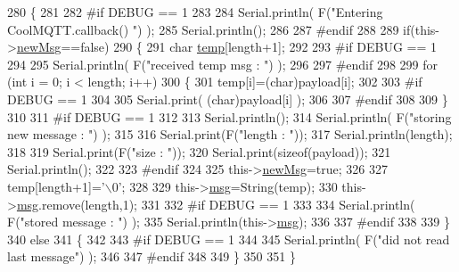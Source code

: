 \begin{DoxyCode}
280 \{
281 
282 \textcolor{preprocessor}{#if DEBUG == 1}
283 
284     Serial.println( F(\textcolor{stringliteral}{"Entering CoolMQTT.callback() "}) );
285     Serial.println();
286 
287 \textcolor{preprocessor}{#endif }
288 
289     \textcolor{keywordflow}{if}(this->\hyperlink{classCoolMQTT_a3240388137b885775aadf38e96b24c6b}{newMsg}==\textcolor{keyword}{false})
290     \{
291         \textcolor{keywordtype}{char} \hyperlink{Irene3000_8h_a5905d48604152cf57aa6bfa087b49173}{temp}[length+1];
292 
293 \textcolor{preprocessor}{    #if DEBUG == 1}
294 
295         Serial.println( F(\textcolor{stringliteral}{"received temp msg : "}) );
296         
297 \textcolor{preprocessor}{    #endif}
298         
299         \textcolor{keywordflow}{for} (\textcolor{keywordtype}{int} i = 0; i < length; i++) 
300         \{
301             temp[i]=(char)payload[i];
302         
303 \textcolor{preprocessor}{        #if DEBUG == 1 }
304 
305             Serial.print( (\textcolor{keywordtype}{char})payload[i] );
306         
307 \textcolor{preprocessor}{        #endif}
308 
309         \}
310     
311 \textcolor{preprocessor}{    #if DEBUG == 1 }
312 
313         Serial.println();
314         Serial.println( F(\textcolor{stringliteral}{"storing new message : "}) );
315 
316         Serial.print(F(\textcolor{stringliteral}{"length : "}));
317         Serial.println(length);
318         
319         Serial.print(F(\textcolor{stringliteral}{"size : "}));
320         Serial.print(\textcolor{keyword}{sizeof}(payload));
321         Serial.println();
322     
323 \textcolor{preprocessor}{    #endif}
324 
325         this->\hyperlink{classCoolMQTT_a3240388137b885775aadf38e96b24c6b}{newMsg}=\textcolor{keyword}{true};
326 
327         temp[length+1]=\textcolor{charliteral}{'\(\backslash\)0'};
328 
329         this->\hyperlink{classCoolMQTT_af6b19e7074dbbb4ae493c44dcb53f7ff}{msg}=String(temp);
330         this->\hyperlink{classCoolMQTT_af6b19e7074dbbb4ae493c44dcb53f7ff}{msg}.remove(length,1);
331     
332 \textcolor{preprocessor}{    #if DEBUG == 1 }
333 
334         Serial.println( F(\textcolor{stringliteral}{"stored message : "}) );
335         Serial.println(this->\hyperlink{classCoolMQTT_af6b19e7074dbbb4ae493c44dcb53f7ff}{msg});
336     
337 \textcolor{preprocessor}{    #endif}
338 
339     \}
340     \textcolor{keywordflow}{else}
341     \{
342     
343 \textcolor{preprocessor}{    #if DEBUG == 1}
344 
345         Serial.println( F(\textcolor{stringliteral}{"did not read last message"}) );
346     
347 \textcolor{preprocessor}{    #endif }
348         
349     \}
350 
351 \}
\end{DoxyCode}
